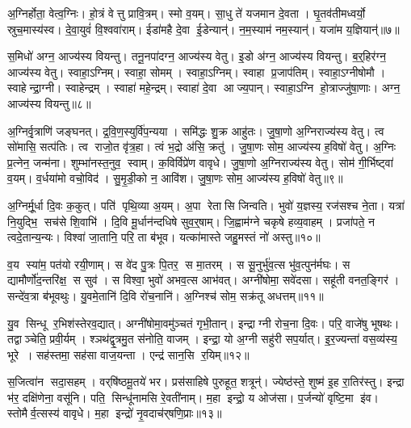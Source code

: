 अ॒ग्निर्\mbox{}होता॒ वेत्व॒ग्निः।
हो॒त्रं वेत्तु प्रावि॒त्रम्।
स्मो व॒यम्।
सा॒धु ते॑ यजमान दे॒वता।
घृ॒तव॑तीमध्वर्यो॒ स्रुच॒मास्य॑स्व।
दे॒वा॒युवं॑ वि॒श्ववा॑राम्।
ईडा॑महै दे॒वा ई॒डेन्यान्॑।
न॒म॒स्याम॑ नम॒स्यान्॑।
यजा॑म य॒ज्ञियान्॑॥७॥\anuvakamend[अ॒ग्निर्‌होता॒ नव॑]

स॒मिधो॑ अग्न॒ आज्य॑स्य वियन्तु।
तनू॒नपा॑दग्न॒ आज्य॑स्य वेतु।
इ॒डो अ॑ग्न॒ आज्य॑स्य वियन्तु।
ब॒र्॒हिर॑ग्न॒ आज्य॑स्य वेतु।
स्वाहा॒ऽग्निम्।
स्वाहा॒ सोमम्।
स्वाहा॒ऽग्निम्।
स्वाहा प्र॒जाप॑तिम्।
स्वाहा॒ऽग्नीषोमौ।
स्वाहेन्द्रा॒ग्नी।
स्वाहेन्द्रम्।
स्वाहा॑ महे॒न्द्रम्।
स्वाहा॑ दे॒वा आज्य॒पान्।
स्वाहा॒ऽग्नि हो॒त्राज्जु॑षा॒णाः।
अग्न॒ आज्य॑स्य वियन्तु॥८॥\anuvakamend[इ॒न्द्रा॒ग्नी पञ्च॑ च]

अ॒ग्निर्वृ॒त्राणि॑ जङ्घनत्।
द्र॒वि॒ण॒स्युर्वि॑प॒न्यया।
समि॑द्धः शु॒क्र आहु॑तः।
जु॒षा॒णो अ॒ग्निराज्य॑स्य वेतु।
त्व सो॑मासि॒ सत्प॑तिः।
त्व राजो॒त वृ॑त्र॒हा।
त्वं भ॒द्रो अ॑सि॒ क्रतु॑।
जु॒षा॒णः सोम॒ आज्य॑स्य ह॒विषो॑ वेतु।
अ॒ग्निः प्र॒त्नेन॒ जन्म॑ना।
शुम्भा॑नस्त॒नुव॒ स्वाम्।
क॒विर्विप्रे॑ण वावृधे।
जु॒षा॒णो अ॒ग्निराज्य॑स्य वेतु।
सोम॑ गी॒र्भिष्ट्वा॑ व॒यम्।
व॒र्धया॑मो वचो॒विद॑।
सु॒मृ॒डी॒को न॒ आवि॑श।
जु॒षा॒णः सोम॒ आज्य॑स्य ह॒विषो॑ वेतु॥९॥\anuvakamend[स्वा षट् च॑]

अ॒ग्निर्मू॒र्धा दि॒वः क॒कुत्।
पति॑ पृथि॒व्या अ॒यम्।
अ॒पा रेतासि जिन्वति।
भुवो॑ य॒ज्ञस्य॒ रज॑सश्च ने॒ता।
यत्रा॑ नि॒युद्भि॒ सच॑से शि॒वाभि॑।
दि॒वि मू॒र्धान॑न्दधिषे सुव॒र्॒षाम्।
जि॒ह्वाम॑ग्ने चकृषे हव्य॒वाहम्।
प्रजा॑पते॒ न त्वदे॒तान्य॒न्यः।
विश्वा॑ जा॒तानि॒ परि॒ ता ब॑भूव।
यत्का॑मास्ते जहु॒मस्तं नो॑ अस्तु॥१०॥

व॒य स्या॑म॒ पत॑यो रयी॒णाम्।
स वे॑द पु॒त्रः पि॒तर॒ स मा॒तरम्।
स सू॒नुर्भु॑व॒त्स भु॑व॒त्पुन॑र्मघः।
स द्यामौर्णो॑द॒न्तरि॑क्ष॒ स सुव॑।
स विश्वा॒ भुवो॑ अभव॒त्स आभ॑वत्।
अग्नी॑षोमा॒ सवे॑दसा।
सहू॑ती वनत॒ङ्गिर॑।
सन्दे॑व॒त्रा ब॑भूवथुः।
यु॒वमे॒तानि॑ दि॒वि रो॑च॒नानि॑।
अ॒ग्निश्च॑ सोम॒ सक्र॑तू अधत्तम्॥११॥

यु॒व सिन्धू र॒भिश॑स्तेरव॒द्यात्।
अग्नी॑षोमा॒वमु॑ञ्चतं गृभी॒तान्।
इन्द्राग्नी रोच॒ना दि॒वः।
परि॒ वाजे॑षु भूषथः।
तद्वाञ्चेति॒ प्रवी॒र्यम्।
श्ञथ॑द्वृ॒त्रमु॒त स॑नोति॒ वाजम्।
इन्द्रा॒ यो अ॒ग्नी सहु॑री सप॒र्यात्।
इ॒र॒ज्यन्ता॑ वस॒व्य॑स्य॒ भूरे।
सह॑स्तमा॒ सह॑सा वाज॒यन्ता।
एन्द्र॑ सान॒सि र॒यिम्॥१२॥

स॒जित्वा॑न सदा॒सहम्।
वर्‌षि॑ष्ठमू॒तये॑ भर।
प्रस॑साहिषे पुरुहूत॒ शत्रून्॑।
ज्येष्ठ॑स्ते॒ शुष्म॑ इ॒ह रा॒तिर॑स्तु।
इन्द्रा भ॑र॒ दक्षि॑णेना॒ वसू॑नि।
पति॒ सिन्धू॑नामसि रे॒वती॑नाम्।
म॒हा इन्द्रो॒ य ओज॑सा।
प॒र्जन्यो॑ वृष्टि॒मा इ॑व।
स्तोमैर्व॒त्सस्य॑ वावृधे।
म॒हा इन्द्रो॑ नृ॒वदाच॑र्‌षणि॒प्राः॥१३॥

